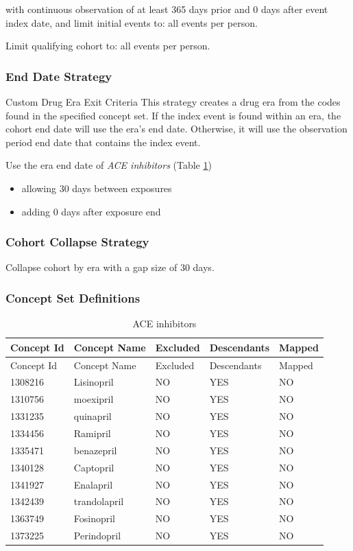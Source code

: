 \documentclass[10.5pt]{book}
\providecommand{\tightlist}{%
  \setlength{\itemsep}{0pt}\setlength{\parskip}{0pt}}
\theoremstyle{definition}
\theoremstyle{definition}
\theoremstyle{definition}
\theoremstyle{remark}
\begin{document}
with continuous observation of at least 365 days prior and 0 days after
event index date, and limit initial events to: all events per person.

Limit qualifying cohort to: all events per person.

\subsubsection*{End Date Strategy}\label{end-date-strategy}

Custom Drug Era Exit Criteria This strategy creates a drug era from the
codes found in the specified concept set. If the index event is found
within an era, the cohort end date will use the era's end date.
Otherwise, it will use the observation period end date that contains the
index event.

Use the era end date of \emph{ACE inhibitors} (Table
\ref{tab:aceInhibitors})

\begin{itemize}
\tightlist
\item
  allowing 30 days between exposures
\item
  adding 0 days after exposure end
\end{itemize}

\subsubsection*{Cohort Collapse
Strategy}\label{cohort-collapse-strategy}

Collapse cohort by era with a gap size of 30 days.

\subsubsection*{Concept Set Definitions}\label{concept-set-definitions}

\begin{longtable}[]{@{}lllll@{}}
\caption{\label{tab:aceInhibitors} ACE inhibitors}\tabularnewline
\toprule
Concept Id & Concept Name & Excluded & Descendants &
Mapped\tabularnewline
\midrule
\endfirsthead
\toprule
Concept Id & Concept Name & Excluded & Descendants &
Mapped\tabularnewline
\midrule
\endhead
1308216 & Lisinopril & NO & YES & NO\tabularnewline
1310756 & moexipril & NO & YES & NO\tabularnewline
1331235 & quinapril & NO & YES & NO\tabularnewline
1334456 & Ramipril & NO & YES & NO\tabularnewline
1335471 & benazepril & NO & YES & NO\tabularnewline
1340128 & Captopril & NO & YES & NO\tabularnewline
1341927 & Enalapril & NO & YES & NO\tabularnewline
1342439 & trandolapril & NO & YES & NO\tabularnewline
1363749 & Fosinopril & NO & YES & NO\tabularnewline
1373225 & Perindopril & NO & YES & NO\tabularnewline
\bottomrule
\end{longtable}
\end{document}
